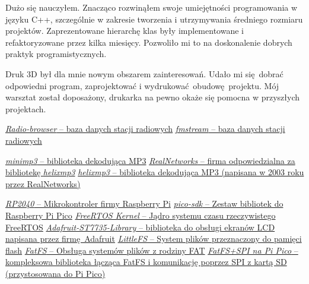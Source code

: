 \documentclass[polish]{aghengthesis}
\begin{document}
		Dużo się nauczyłem.
		Znacząco rozwinąłem swoje umiejętności programowania w języku C++, szczególnie w zakresie tworzenia i utrzymywania średniego rozmiaru projektów. Zaprezentowane hierarchę klas były implementowane i refaktoryzowane przez kilka miesięcy. Pozwoliło mi to na doskonalenie dobrych praktyk programistycznych.
		
		$ $\\
		Druk 3D był dla mnie nowym obszarem zainteresowań. Udało mi się dobrać odpowiedni program, zaprojektować i wydrukować obudowę projektu. 
		Mój warsztat został doposażony, drukarka na pewno okaże się pomocna w przyszłych projektach.
			
		
	\pagebreak
	\begin{thebibliography}{9}
		\href{https://www.radio-browser.info/}{\textit{Radio-browser} -- baza danych stacji radiowych}
		\href{http://fmstream.org}{\textit{fmstream} -- baza danych stacji radiowych}
		
		\href{https://github.com/lieff/minimp3}{\textit{minimp3} -- biblioteka dekodująca MP3}
		\href{https://realnetworks.com}{\textit{RealNetworks} -- firma odpowiedzialna za bibliotekę \textit{helixmp3}}
		\href{https://github.com/ultraembedded/libhelix-mp3}{\textit{helixmp3} -- biblioteka dekodująca MP3 (napisana w 2003 roku przez RealNetworks)}
		
		\href{https://www.raspberrypi.com/documentation/microcontrollers/rp2040.html}{\textit{RP2040} -- Mikrokontroler firmy Raspberry Pi}
		\href{https://github.com/raspberrypi/pico-sdk}{\textit{pico-sdk} -- Zestaw bibliotek do Raspberry Pi Pico}
		\href{https://github.com/FreeRTOS/FreeRTOS-Kernel}{\textit{FreeRTOS Kernel} -- Jądro systemu czasu rzeczywistego FreeRTOS}
		\href{https://github.com/adafruit/Adafruit-ST7735-Library}{\textit{Adafruit-ST7735-Library} -- biblioteka do obsługi ekranów LCD napisana przez firmę Adafruit}
		\href{https://github.com/littlefs-project/littlefs}{\textit{LittleFS} -- System plików przeznaczony do pamięci flash}
		\href{http://elm-chan.org/fsw/ff/00index_e.html}{\textit{FatFS} -- Obsługa systemów plików z rodziny FAT}
		\href{https://github.com/carlk3/no-OS-FatFS-SD-SPI-RPi-Pico}{\textit{FatFS+SPI na Pi Pico} --  kompleksowa biblioteka łącząca FatFS i komunikację poprzez SPI z kartą SD (przystosowana do Pi Pico)}
		

\end{thebibliography}
\end{document}
